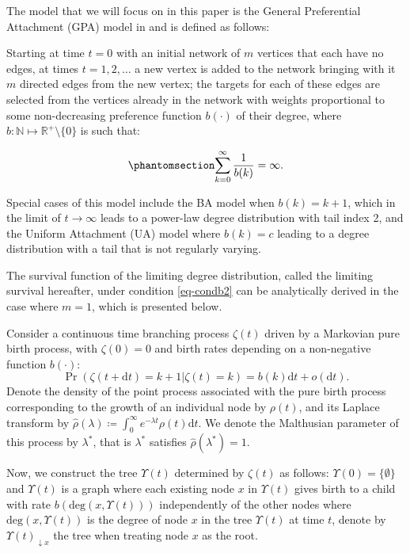 \documentclass[
  sn-basic,
  10pt,
]{sn-jnl}
\theoremstyle{plain}
\theoremstyle{plain}
\theoremstyle{remark}
\begin{document}
The model that we will focus on in this paper is the General
Preferential Attachment (GPA) model in \citet{rudas07} and is defined as
follows:

Starting at time \(t=0\) with an initial network of \(m\) vertices that
each have no edges, at times \(t=1,2,\ldots\) a new vertex is added to
the network bringing with it \(m\) directed edges from the new vertex;
the targets for each of these edges are selected from the vertices
already in the network with weights proportional to some non-decreasing
preference function \(b(\cdot)\) of their degree, where
\(b: \mathbb N \mapsto \mathbb R^+\setminus\{0\}\) is such that:

\begin{equation}\phantomsection\label{eq-condb2}{
\sum_{k=0}^\infty\frac{1}{b(k)} = \infty.
}\end{equation}

Special cases of this model include the BA model when $b(k) = k+1$, which in the limit of $t\rightarrow \infty$ leads to a power-law degree distribution with tail index 2, and the Uniform Attachment (UA) model where $b(k)=c$ leading to a degree distribution with a tail that is not regularly varying.

The survival function of the limiting degree distribution, called the
limiting survival hereafter, under condition \ref{eq-condb2} can be
analytically derived in the case where \(m=1\), which is presented
below.

Consider a continuous time branching process \(\zeta(t)\) driven by a
Markovian pure birth process, with \(\zeta(0)=0\) and birth rates
depending on a non-negative function \(b(\cdot)\): \[
\Pr(\zeta(t+\text{d}t)=k+1|\zeta(t)=k) = b(k)\text{d}t + o(\text{d}t).
\] Denote the density of the point process associated with the pure
birth process corresponding to the growth of an individual node by
\(\rho(t)\), and its Laplace transform by
\(\hat \rho(\lambda)\coloneqq \int_0^\infty e^{-\lambda t}\rho(t)\text{d}t\).
We denote the Malthusian parameter of this process by \(\lambda^*\),
that is \(\lambda^*\) satisfies \(\hat\rho(\lambda^*) = 1\).

Now, we construct the tree \(\Upsilon(t)\) determined by \(\zeta(t)\) as
follows: \(\Upsilon(0)=\{\emptyset\}\) and \(\Upsilon(t)\) is a graph
where each existing node \(x\) in \(\Upsilon(t)\) gives birth to a child
with rate \(b(\mathrm{deg}(x, \Upsilon(t)))\) independently of the other
nodes where \(\mathrm{deg}(x, \Upsilon(t))\) is the degree of node \(x\)
in the tree \(\Upsilon(t)\) at time \(t\), denote by
\(\Upsilon(t)_{\downarrow x}\) the tree when treating node \(x\) as the
root.
\end{document}
